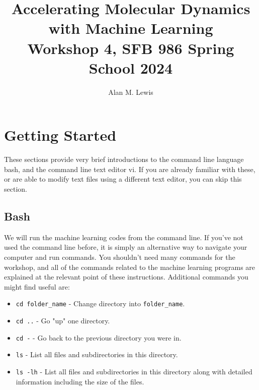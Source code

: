 \documentclass{article}
\title{Accelerating Molecular Dynamics with Machine Learning \\ Workshop 4, SFB 986 Spring School 2024}
\author{Alan M. Lewis}
\date{}
\begin{document}
\maketitle

\section{Getting Started}


These sections provide very brief introductions to the command line language bash, and the command line text editor vi. If you are already familiar with these, or are able to modify text files using a different text editor, you can skip this section.

\subsection{Bash}

We will run the machine learning codes from the command line. If you've not used the command line before, it is simply an alternative way to navigate your computer and run commands. You shouldn't need many commands for the workshop, and all of the commands related to the machine learning programs are explained at the relevant point of these instructions. Additional commands you might find useful are:

\begin{itemize}

\item \verb|cd folder_name| - Change directory into \verb|folder_name|.
\item \verb|cd ..| - Go "up" one directory.
\item \verb|cd -| - Go back to the previous directory you were in.
\item \verb|ls| - List all files and subdirectories in this directory.
\item \verb|ls -lh| - List all files and subdirectories in this directory along with detailed information including the size of the files.

\end{itemize}
\end{document}
